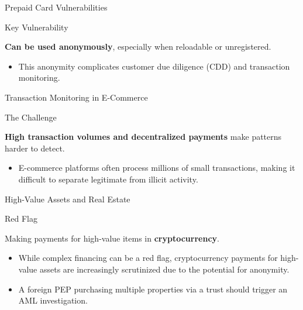\documentclass{beamer}
\begin{document}
	\begin{frame}{Prepaid Card Vulnerabilities}
		\begin{block}{Key Vulnerability}
			\begin{center}
				\textbf{Can be used anonymously}, especially when reloadable or unregistered.
			\end{center}
		\end{block}
		\begin{itemize}
			\item This anonymity complicates customer due diligence (CDD) and transaction monitoring.
		\end{itemize}
	\end{frame}
	
	\begin{frame}{Transaction Monitoring in E-Commerce}
		\begin{block}{The Challenge}
			\begin{center}
				\textbf{High transaction volumes and decentralized payments} make patterns harder to detect.
			\end{center}
		\end{block}
		\begin{itemize}
			\item E-commerce platforms often process millions of small transactions, making it difficult to separate legitimate from illicit activity.
		\end{itemize}
	\end{frame}
	
	\begin{frame}{High-Value Assets and Real Estate}
		\begin{block}{Red Flag}
			\begin{center}
				Making payments for high-value items in \textbf{cryptocurrency}.
			\end{center}
		\end{block}
		\begin{itemize}
			\item While complex financing can be a red flag, cryptocurrency payments for high-value assets are increasingly scrutinized due to the potential for anonymity.
			\item A foreign PEP purchasing multiple properties via a trust should trigger an AML investigation.
		\end{itemize}
	\end{frame}
	
\end{document}
